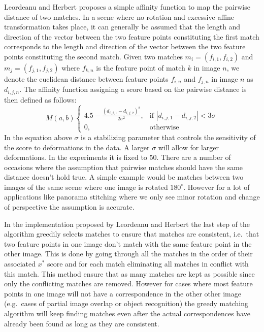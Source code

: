 Leordeanu and Herbert proposes a simple affinity function to map the 
pairwise distance of two matches. In a scene where no rotation and 
excessive affine transformation takes place, it can generally be assumed 
that the length and direction of the vector between
the two feature points constituting the first match corresponds to the 
length and direction of the vector between the two feature points 
constituting the second match. Given two matches $m_i = (f_{i,1}, 
f_{i,2})$ and $m_j = (f_{j,1},f_{j,2})$ where $f_{k,n}$ is the feature 
point of match $k$ in image $n$, we denote the euclidean distance 
between feature points $f_{i,n}$ and $f_{j,n}$ in image $n$ as 
$d_{i,j,n}$.  The affinity function assigning a score based on the 
pairwise distance is then defined as follows:
\begin{equation*}
	M(a,b) \begin{cases} 4.5 - \frac{\left(d_{i,j,1} - 
		d_{i,j,2}\right)^2}{2\sigma^2}, & \mbox{if } \left\vert 
				d_{i,j,1} - d_{i,j,2} \right\vert < 3\sigma \\ 0, & 
				\mbox{otherwise}
	\end{cases}
\end{equation*}
In the equation above $\sigma$ is a stabilizing parameter that controls 
the sensitivity of the score to deformations in the data. A larger 
$\sigma$ will allow for larger deformations. In the experiments it is 
fixed to 50. There are a number of occasions where the assumption that 
pairwise matches should have the same distance doesn't hold true.  A 
simple example would be matches between two images of the same scene 
where one image is rotated $180^{\circ}$.  However for a lot of 
applications like panorama stitching where we only see minor rotation 
and change of perspective the assumption is accurate.

In the implementation proposed by Leordeanu and Herbert 
\cite{leordeanu2005spectral} the last step of the algorithm greedily 
selects matches to ensure that matches are consistent, i.e.\ that two 
feature points in one image don't match with the same feature point in 
the other image. This is done by going through all the matches in the 
order of their associated $x^{*}$ score and for each match eliminating 
all matches in conflict with this match. This method ensure that as many
matches are kept as possible since only the conflicting matches are 
removed. However for cases where most feature points in one image will 
not have a correspondence in the other other image (e.g.\ cases of 
partial image overlap or object recognition) the greedy matching 
algorithm will keep finding matches even after the actual 
correspondences have already been found as long as they are consistent.

